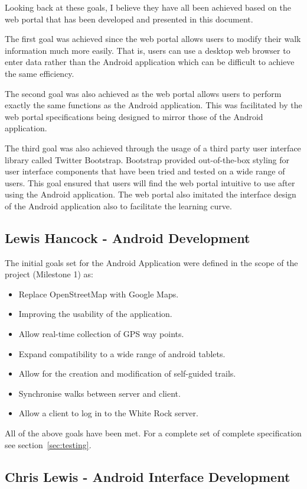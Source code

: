 \documentclass[11pt,a4paper]{report}
\begin{document}
Looking back at these goals, I believe they have all been achieved based on the web portal that has been developed and presented in this document.

The first goal was achieved since the web portal allows users to modify their walk information much more easily. That is, users can use a desktop web browser to enter data rather than the Android application which can be difficult to achieve the same efficiency.

The second goal was also achieved as the web portal allows users to perform exactly the same functions as the Android application. This was facilitated by the web portal specifications being designed to mirror those of the Android application.

The third goal was also achieved through the usage of a third party user interface library called Twitter Bootstrap. Bootstrap provided out-of-the-box styling for user interface components that have been tried and tested on a wide range of users. This goal ensured that users will find the web portal intuitive to use after using the Android application. The web portal also imitated the interface design of the Android application also to facilitate the learning curve.

\subsection{Lewis Hancock - Android Development}
The initial goals set for the Android Application were defined in the scope of the project (Milestone 1) as:
\begin{itemize}
\item Replace OpenStreetMap with Google Maps.
\item Improving the usability of the application.
\item Allow real-time collection of GPS way points.
\item Expand compatibility to a wide range of android tablets.
\item Allow for the creation and modification of self-guided trails.
\item Synchronise walks between server and client.
\item Allow a client to log in to the White Rock server.
\end{itemize}
All of the above goals have been met. For a complete set of complete specification see section~\ref{sec:testing}.
\subsection{Chris Lewis - Android Interface Development}
\end{document}
